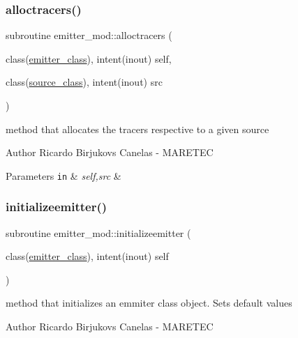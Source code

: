 \subsubsection{\texorpdfstring{alloctracers()}{alloctracers()}}
{\footnotesize\ttfamily subroutine emitter\+\_\+mod\+::alloctracers (\begin{DoxyParamCaption}\item[{class(\hyperlink{structemitter__mod_1_1emitter__class}{emitter\+\_\+class}), intent(inout)}]{self,  }\item[{class(\hyperlink{structsources__mod_1_1source__class}{source\+\_\+class}), intent(inout)}]{src }\end{DoxyParamCaption})\hspace{0.3cm}{\ttfamily [private]}}



method that allocates the tracers respective to a given source 

\begin{DoxyAuthor}{Author}
Ricardo Birjukovs Canelas -\/ M\+A\+R\+E\+T\+EC 
\end{DoxyAuthor}

\begin{DoxyParams}[1]{Parameters}
\mbox{\tt in}  & {\em self,src} & \\
\hline
\end{DoxyParams}
\mbox{\label{namespaceemitter__mod_a6376ad0f8e1739b29caf672aa0750373}} 
\subsubsection{\texorpdfstring{initializeemitter()}{initializeemitter()}}
{\footnotesize\ttfamily subroutine emitter\+\_\+mod\+::initializeemitter (\begin{DoxyParamCaption}\item[{class(\hyperlink{structemitter__mod_1_1emitter__class}{emitter\+\_\+class}), intent(inout)}]{self }\end{DoxyParamCaption})\hspace{0.3cm}{\ttfamily [private]}}



method that initializes an emmiter class object. Sets default values 

\begin{DoxyAuthor}{Author}
Ricardo Birjukovs Canelas -\/ M\+A\+R\+E\+T\+EC 
\end{DoxyAuthor}

